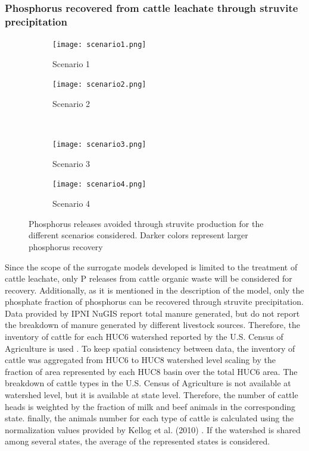 \documentclass[10pt,a4paper]{article}
\begin{document}
\subsubsection{Phosphorus recovered from cattle leachate through struvite precipitation}
\begin{figure}
	\begin{subfigure}[t]{0.49\textheight}
		\texttt{[image: scenario1.png]}
		\caption{Scenario 1}
		\label{fig:scenario1}
	\end{subfigure}
	\begin{subfigure}[t]{0.49\textheight}
		\texttt{[image: scenario2.png]} 
		\caption{Scenario 2}
		\label{fig:scenario2}
	\end{subfigure}
	\\
	\begin{subfigure}[t]{0.49\textheight}
		\texttt{[image: scenario3.png]}
		\caption{Scenario 3}
		\label{fig:scenario3}
	\end{subfigure}
	\begin{subfigure}[t]{0.49\textheight}
		\texttt{[image: scenario4.png]}
		\caption{Scenario 4}
		\label{fig:scenario4}
	\end{subfigure}
	
	\caption{Phosphorus releases avoided through struvite production for the different scenarios considered. Darker colors represent larger phosphorus recovery}
	\label{fig:plot_scenarios}
\end{figure}

Since the scope of the surrogate models developed is limited to the treatment of cattle leachate, only P releases from cattle organic waste will be considered for recovery. Additionally, as it is mentioned in the description of the model, only the phosphate fraction of phosphorus can be recovered through struvite precipitation. Data provided by IPNI NuGIS  report total manure generated, but do not report the breakdown of manure generated by different livestock sources. Therefore, the inventory of cattle for each HUC6 watershed reported by the U.S. Census of Agriculture is used . To keep spatial consistency between data, the inventory of cattle was aggregated from HUC6 to HUC8 watershed level scaling by the fraction of area represented by each HUC8 basin over the total HUC6 area. The breakdown of cattle types in the U.S. Census of Agriculture is not available at watershed level, but it is available at state level. Therefore, the number of cattle heads is weighted by the fraction of milk and beef animals in the corresponding state. finally, the animals number for each type of cattle is calculated using the normalization values provided by Kellog et al. (2010) . If the watershed is shared among several states, the average of the represented states is considered.
\end{document}
